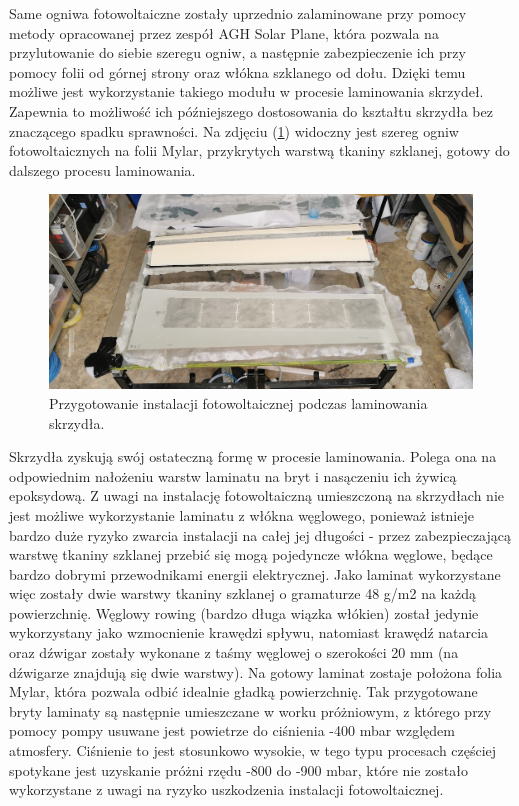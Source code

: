 \documentclass[12pt, a4paper]{article}
\let\oldref\ref
\renewcommand{\ref}[1]{(\oldref{#1})}
\begin{document}
Same ogniwa fotowoltaiczne zostały uprzednio zalaminowane przy pomocy metody opracowanej przez zespół AGH Solar Plane, która pozwala na przylutowanie do siebie szeregu ogniw, a następnie zabezpieczenie ich przy pomocy folii od górnej strony oraz włókna szklanego od dołu. Dzięki temu możliwe jest wykorzystanie takiego modułu w procesie laminowania skrzydeł. Zapewnia to możliwość ich późniejszego dostosowania do kształtu skrzydła bez znaczącego spadku sprawności. Na zdjęciu \ref{fig:laminowanie} widoczny jest szereg ogniw fotowoltaicznych na folii Mylar, przykrytych warstwą tkaniny szklanej, gotowy do dalszego procesu laminowania.

 \begin{figure}[ht]
    \centering
    \includegraphics[width=1\textwidth]{budowa7}
    \caption{Przygotowanie instalacji fotowoltaicznej podczas laminowania skrzydła.}
    \label{fig:laminowanie}
\end{figure}

Skrzydła zyskują swój ostateczną formę w procesie laminowania. Polega ona na odpowiednim nałożeniu warstw laminatu na bryt i nasączeniu ich żywicą epoksydową. Z uwagi na instalację fotowoltaiczną umieszczoną na skrzydłach nie jest możliwe wykorzystanie laminatu z włókna węglowego, ponieważ istnieje bardzo duże ryzyko zwarcia instalacji na całej jej długości - przez zabezpieczającą warstwę tkaniny szklanej przebić się mogą pojedyncze włókna węglowe, będące bardzo dobrymi przewodnikami energii elektrycznej. Jako laminat wykorzystane więc zostały dwie warstwy tkaniny szklanej o gramaturze 48 g/m2 na każdą powierzchnię. Węglowy rowing (bardzo długa wiązka włókien) został jedynie wykorzystany jako wzmocnienie krawędzi spływu, natomiast krawędź natarcia oraz dźwigar zostały wykonane z taśmy węglowej o szerokości 20 mm (na dźwigarze znajdują się dwie warstwy). Na gotowy laminat zostaje położona folia Mylar, która pozwala odbić idealnie gładką powierzchnię. Tak przygotowane bryty laminaty są następnie umieszczane w worku próżniowym, z którego przy pomocy pompy usuwane jest powietrze do ciśnienia -400 mbar względem atmosfery. Ciśnienie to jest stosunkowo wysokie, w tego typu procesach częściej spotykane jest uzyskanie próżni rzędu -800 do -900 mbar, które nie zostało wykorzystane z uwagi na ryzyko uszkodzenia instalacji fotowoltaicznej.
\end{document}
